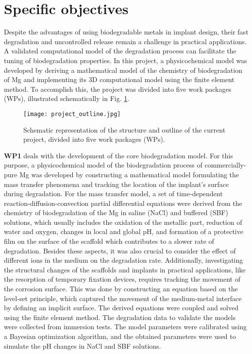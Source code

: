 \section{Specific objectives} \label{sec:aim_objective}


Despite the advantages of using biodegradable metals in implant design, their fast degradation and uncontrolled release remain a challenge in practical applications. A validated computational model of the degradation process can facilitate the tuning of biodegradation properties. In this project, a physicochemical model was developed by deriving a mathematical model of the chemistry of biodegradation of Mg and implementing its 3D computational model using the finite element method. To accomplish this, the project was divided into five work packages (\gls{WP}s), illustrated schematically in Fig. \ref{fig:objective_project_outline}.

\begin{figure}
\centering
\medskip
\texttt{[image: project\_outline.jpg]}
\caption[Schematic of the project outline]{Schematic representation of the structure and outline of the current project, divided into five work packages (\gls{WP}s).} \label{fig:objective_project_outline}
\end{figure}

\textbf{WP1} deals with the development of the core biodegradation model. For this purpose, a physicochemical model of the biodegradation process of commercially-pure Mg was developed by constructing a mathematical model formulating the mass transfer phenomena and tracking the location of the implant's surface during degradation. For the mass transfer model, a set of time-dependent reaction-diffusion-convection partial differential equations were derived from the chemistry of biodegradation of the Mg in saline (NaCl) and buffered (\gls{SBF}) solutions, which usually includes the oxidation of the metallic part, reduction of water and oxygen, changes in local and global pH, and formation of a protective film on the surface of the scaffold which contributes to a slower rate of degradation. Besides these aspects, it was also crucial to consider the effect of different ions in the medium on the degradation rate. Additionally, investigating the structural changes of the scaffolds and implants in practical applications, like the resorption of temporary fixation devices, requires tracking the movement of the corrosion surface. This was done by constructing an equation based on the level-set principle, which captured the movement of the medium-metal interface by defining an implicit surface. The derived equations were coupled and solved using the finite element method. The degradation data to validate the models were collected from immersion tests. The model parameters were calibrated using a Bayesian optimization algorithm, and the obtained parameters were used to simulate the pH changes in NaCl and \gls{SBF} solutions.

